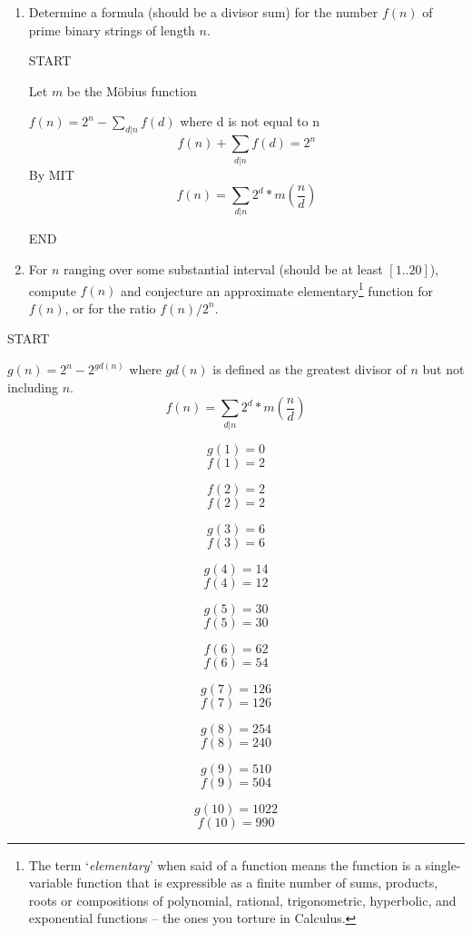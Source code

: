 \documentclass[10pt, AMS Euler]{article}
\begin{document}
\begin{enumerate}
		\begin{enumerate}
			\item Determine a formula (should be a divisor sum) for the number $f(n)$ of prime binary strings of length $n$. 
   
                START
                
                Let $m$ be the Möbius function

                $ f(n) = 2^n - \sum_{d | n} f(d) $ where d is not equal to n
                $$ f(n) + \sum_{d | n} f(d) = 2^n $$
                By MIT
                $$ f(n) = \sum_{d | n} 2^d * m(\frac{n}{d}) $$

                END

            \newpage    
			\item For $n$ ranging over some substantial interval (should be at least  $[1..20]$), compute $f(n)$ and conjecture an approximate elementary\footnote{The term `\emph{elementary}' when said of a function means the function is a single-variable function that is expressible as a finite number of sums, products, roots or compositions of  polynomial, rational, trigonometric, hyperbolic, and exponential functions -- the ones you torture in Calculus.} function for $f(n)$, or for the ratio $f(n)/2^n$.
		\end{enumerate}

            START

            $g(n) = 2^n - 2^{gd(n)}$ where $gd(n)$ is defined as the greatest divisor of $n$ but not including $n$.
            $$ f(n) = \sum_{d | n} 2^d * m(\frac{n}{d}) $$

            \newpage
            $$ g(1) = 0 $$
            $$ f(1) = 2 $$ 

            $$ f(2) = 2 $$
            $$ f(2)=2 $$

            $$ g(3) = 6 $$
            $$ f(3) = 6 $$

            $$ g(4) = 14 $$
            $$ f(4) = 12 $$

            $$ g(5) = 30 $$
            $$ f(5) = 30 $$

            $$ f(6) = 62 $$
            $$ f(6) = 54 $$

            $$ g(7) = 126 $$
            $$ f(7) = 126 $$

            $$ g(8) = 254 $$
            $$ f(8) = 240 $$

            $$ g(9) = 510 $$
            $$ f(9) = 504 $$

            $$ g(10) = 1022 $$
            $$ f(10) = 990 $$


\end{enumerate}
\end{document}
